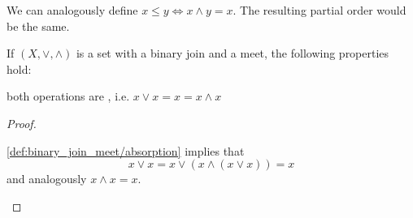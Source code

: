 \begin{remark}\label{remark:binary_join_meet_order}
  We can analogously define \( x \leq y \iff x \wedge y = x \). The resulting partial order would be the same.
\end{remark}

\begin{proposition}\label{thm:binary_join_meet_properties}
  If \( (X, \vee, \wedge) \) is a set with a binary join and a meet, the following properties hold:
  \begin{defenum}
     both operations are , i.e. \( x \vee x = x = x \wedge x \)
  \end{defenum}
\end{proposition}
\begin{proof}
  \begin{description}
     \ref{def:binary_join_meet/absorption} implies that
    \begin{equation*}
      x \vee x = x \vee (x \wedge (x \vee x)) = x
    \end{equation*}
    and analogously \( x \wedge x = x \).
  \end{description}
\end{proof}

